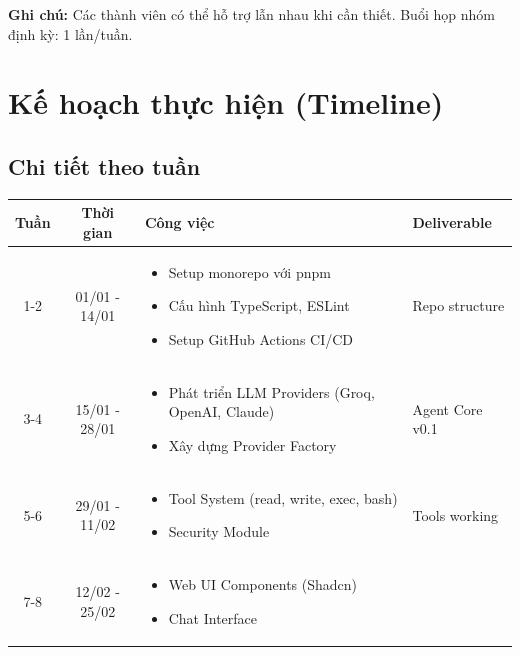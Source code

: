 \documentclass[12pt,a4paper]{article}
\begin{document}
\textbf{Ghi chú:} Các thành viên có thể hỗ trợ lẫn nhau khi cần thiết. Buổi họp nhóm định kỳ: 1 lần/tuần.

\section{Kế hoạch thực hiện (Timeline)}

\subsection{Chi tiết theo tuần}

\begin{table}[H]
    \centering
    \small
    \begin{tabular}{|c|c|p{7cm}|p{3cm}|}
        \hline
        \textbf{Tuần} & \textbf{Thời gian} & \textbf{Công việc} & \textbf{Deliverable} \\
        \hline
        1-2 & 01/01 - 14/01 & 
        \begin{itemize}[leftmargin=*, nosep]
            \item Setup monorepo với pnpm
            \item Cấu hình TypeScript, ESLint
            \item Setup GitHub Actions CI/CD
        \end{itemize} & Repo structure \\
        \hline
        3-4 & 15/01 - 28/01 & 
        \begin{itemize}[leftmargin=*, nosep]
            \item Phát triển LLM Providers (Groq, OpenAI, Claude)
            \item Xây dựng Provider Factory
        \end{itemize} & Agent Core v0.1 \\
        \hline
        5-6 & 29/01 - 11/02 & 
        \begin{itemize}[leftmargin=*, nosep]
            \item Tool System (read, write, exec, bash)
            \item Security Module
        \end{itemize} & Tools working \\
        \hline
        7-8 & 12/02 - 25/02 & 
        \begin{itemize}[leftmargin=*, nosep]
            \item Web UI Components (Shadcn)
            \item Chat Interface

\end{itemize}
\end{tabular}
\end{table}
\end{document}
